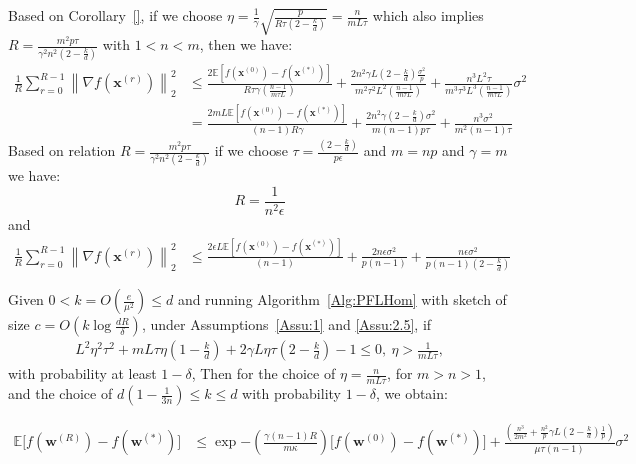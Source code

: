 \begin{corollary}
Based on Corollary~\ref{}, if we choose $\eta=\frac{1}{\gamma}\sqrt{\frac{p}{R\tau\left(2-\frac{k}{d}\right)}}=\frac{n}{mL\tau}$ which also  implies $R=\frac{m^2p\tau}{\gamma^2n^2\left(2-\frac{k}{d}\right)}$ with $1<n<m$, then we have:
\begin{align}
        \frac{1}{R}\sum_{r=0}^{R-1}\left\|\nabla f({\boldsymbol{x}}^{(r)})\right\|_2^2&\leq \frac{2 \mathbb{E}\left[f({\boldsymbol{x}}^{(0)})-f({\boldsymbol{x}}^{(*)})\right]}{R\tau \gamma \left(\frac{n-1}{m\tau L}\right)}+\frac{2n^2\gamma L\left(2-\frac{k}{d}\right)\frac{\sigma^2}{p}}{m^2\tau^2L^2 \left(\frac{n-1}{m\tau L}\right)}+\frac{n^3L^2\tau}{m^3\tau^3L^3\left(\frac{n-1}{m\tau L}\right)}\sigma^2\nonumber\\
        &=\frac{2mL \mathbb{E}\left[f({\boldsymbol{x}}^{(0)})-f({\boldsymbol{x}}^{(*)})\right]}{\left(n-1\right)R \gamma }+\frac{2n^2\gamma \left(2-\frac{k}{d}\right)\sigma^2}{m\left(n-1\right) p\tau  }+\frac{n^3\sigma^2}{m^2\left(n-1\right)\tau}
\end{align}
Based on relation $R=\frac{m^2p\tau}{\gamma^2n^2\left(2-\frac{k}{d}\right)}$ if we choose $\tau=\frac{\left(2-\frac{k}{d}\right)}{p\epsilon}$ and $m=np$ and $\gamma=m$ we have:
$$R=\frac{1}{n^2\epsilon}$$ and 
\begin{align}
     \frac{1}{R}\sum_{r=0}^{R-1}\left\|\nabla f({\boldsymbol{x}}^{(r)})\right\|_2^2&\leq \frac{2\epsilon L \mathbb{E}\left[f({\boldsymbol{x}}^{(0)})-f({\boldsymbol{x}}^{(*)})\right]}{\left(n-1\right)}+\frac{2n\epsilon \sigma^2}{p\left(n-1\right)}+\frac{n\epsilon\sigma^2}{p\left(n-1\right)\left(2-\frac{k}{d}\right)}
\end{align}
\end{corollary}

\begin{theorem}
Given $0<k=O\left(\frac{e}{\mu^2}\right)\leq d$
and running Algorithm~\ref{Alg:PFLHom} with sketch of size $c=O\left(k\log \frac{d R}{\delta}\right)$,  under Assumptions~\ref{Assu:1} and \ref{Assu:2.5}, if 
\begin{align}
       L^2\eta^2\tau^2+mL\tau\eta\left(1-\frac{k}{d}\right)+2\gamma L\eta\tau\left(2-\frac{k}{d}\right)-1\leq 0,\:\eta> \frac{1}{mL\tau},\label{eq:cnd-lrs-h-ii} 
\end{align}
with probability at least $1-\delta$, Then for the choice of $\eta=\frac{n}{mL\tau}$, for $m>n>1$, and the choice of $ d\left(1-\frac{1}{3n}\right)\leq k\leq d$ with probability $1-\delta$,  we obtain:


\begin{align}
                \mathbb{E}\Big[f({\boldsymbol{w}}^{(R)})-f({\boldsymbol{w}}^{(*)})\Big]&\leq\exp{-\left(\frac{\gamma\left(n-1\right) R}{m\kappa}\right) }\Big[f({\boldsymbol{w}}^{(0)})-f({\boldsymbol{w}}^{(*)})\Big]+\frac{\left(\frac{ n^3}{2m^2}+\frac{n^2}{p}\gamma L\left(2-\frac{k}{d}\right)\frac{1}{p} \right)}{\mu\tau\left(n-1\right)}\sigma^2
\end{align}

\end{theorem}

